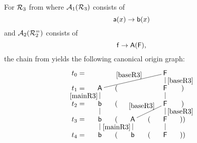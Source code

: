     For $\mathcal{R}_3$ from 
    where $\mathcal{A}_{1}(\mathcal{R}_3)$ consists of
    \begin{equation}\label{mainR3} 
        \mathsf{a}(x) \to \mathsf{b}(x)
    \end{equation}
    and $\mathcal{A}_{2}(\mathcal{R}_2^{=})$ consists of
    \begin{equation}\label{baseR3}
        \mathsf{f} \to \mathsf{A}(\mathsf{F}),
    \end{equation}
    the chain from  yields the following canonical origin graph:
    \[ \xymatrix @-1.5pc @C=1pc{
    t_0= &  &  &  & & \tF\ar@{-}[dllll]_{\eqref{baseR3}}\ar@{-}[d]^{\eqref{baseR3}} &  \\
    t_1= & \tA\ar@{-}[d]_{\eqref{mainR3}} & ( &  & & \tF\ar@{-}[d] & ) \\
    t_2= & \tb\ar@{-}[d] & ( &  & & \tF\ar@{-}[dll]_{\eqref{baseR3}}\ar@{-}[d]^{\eqref{baseR3}} & ) \\
    t_3= & \tb\ar@{-}[d] & ( & \tA\ar@{-}[d]_{\eqref{mainR3}} & ( & \tF\ar@{-}[d] & )) \\
    t_4= & \tb & ( & \tb & ( & \tF & ))
    }
    \]


\RelativeDepGraphProc*

